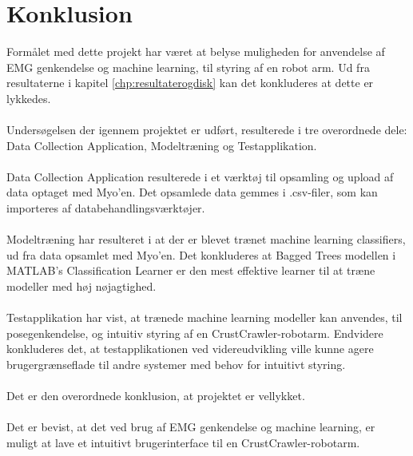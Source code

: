 \thispagestyle{fancy}
\chapter{Konklusion}
\label{chp:konklusion}

Formålet med dette projekt har været at belyse muligheden for anvendelse af EMG genkendelse og machine learning, til styring af en robot arm. Ud fra resultaterne i kapitel \ref{chp:resultaterogdisk} kan det konkluderes at dette er lykkedes.\\\\
Undersøgelsen der igennem projektet er udført, resulterede i tre overordnede dele: Data Collection Application, Modeltræning og Testapplikation.\\\\
Data Collection Application resulterede i et værktøj til opsamling og upload af data optaget med Myo’en. Det opsamlede data gemmes i .csv-filer, som kan importeres af databehandlingsværktøjer.\\\\
Modeltræning har resulteret i at der er blevet trænet machine learning classifiers, ud fra data opsamlet med Myo’en. Det konkluderes at Bagged Trees modellen i MATLAB’s Classification Learner er den mest effektive learner til at træne modeller med høj nøjagtighed.\\\\
Testapplikation har vist, at trænede machine learning modeller kan anvendes, til posegenkendelse, og intuitiv styring af en CrustCrawler-robotarm. Endvidere konkluderes det, at testapplikationen ved videreudvikling ville kunne agere brugergrænseflade til andre systemer med behov for intuitivt styring.\\\\
Det er den overordnede konklusion, at projektet er vellykket.\\\\
Det er bevist, at det ved brug af EMG genkendelse og machine learning, er muligt at lave et intuitivt brugerinterface til en CrustCrawler-robotarm. 

\label{SidsteSide}